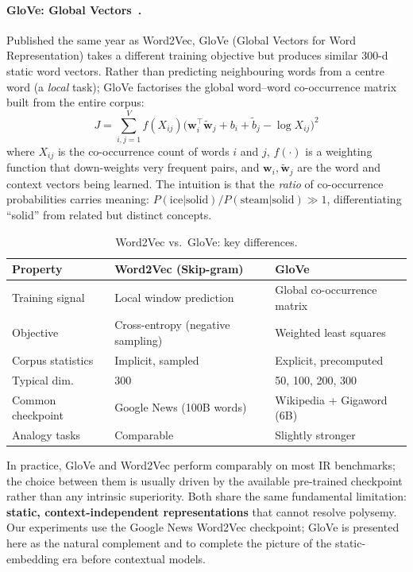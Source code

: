 \documentclass[12pt, a4paper]{article}
\newcommand{\bvec}[1]{\mathbf{#1}}
\begin{document}
\paragraph{GloVe: Global Vectors~\citep{pennington2014glove}.}
Published the same year as Word2Vec, GloVe (Global Vectors for Word
Representation) takes a different training objective but produces similar
300-d static word vectors.  Rather than predicting neighbouring words from
a centre word (a \emph{local} task); GloVe factorises the global
word--word co-occurrence matrix built from the entire corpus:
\begin{equation}
  J = \sum_{i,j=1}^{V} f(X_{ij})
      \bigl(\bvec{w}_i^\top \tilde{\bvec{w}}_j + b_i + \tilde{b}_j
            - \log X_{ij}\bigr)^2
  \label{eq:glove}
\end{equation}
where $X_{ij}$ is the co-occurrence count of words $i$ and $j$, $f(\cdot)$
is a weighting function that down-weights very frequent pairs, and
$\bvec{w}_i, \tilde{\bvec{w}}_j$ are the word and context vectors being
learned.  The intuition is that the \emph{ratio} of co-occurrence
probabilities carries meaning: $P(\text{ice}|\text{solid}) /
P(\text{steam}|\text{solid}) \gg 1$, differentiating ``solid'' from
related but distinct concepts.

\begin{table}[h]
\centering
\caption{Word2Vec vs.\ GloVe: key differences.}
\label{tab:w2v_vs_glove}
\begin{tabular}{lll}
\toprule
\textbf{Property} & \textbf{Word2Vec (Skip-gram)} & \textbf{GloVe} \\
\midrule
Training signal  & Local window prediction & Global co-occurrence matrix \\
Objective        & Cross-entropy (negative sampling) & Weighted least squares \\
Corpus statistics & Implicit, sampled & Explicit, precomputed \\
Typical dim.     & 300 & 50, 100, 200, 300 \\
Common checkpoint & Google News (100B words) & Wikipedia + Gigaword (6B) \\
Analogy tasks    & Comparable & Slightly stronger \\
\bottomrule
\end{tabular}
\end{table}

In practice, GloVe and Word2Vec perform comparably on most IR benchmarks;
the choice between them is usually driven by the available pre-trained
checkpoint rather than any intrinsic superiority.  Both share the same
fundamental limitation: \textbf{static, context-independent representations}
that cannot resolve polysemy.  Our experiments use the Google News Word2Vec
checkpoint; GloVe is presented here as the natural complement and to complete
the picture of the static-embedding era before contextual models.
\end{document}
